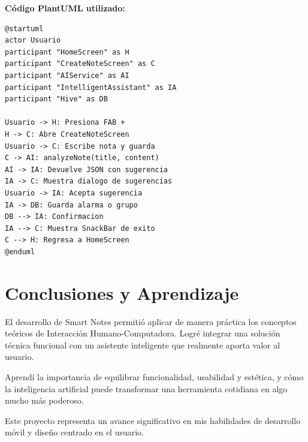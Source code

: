 \documentclass[12pt,a4paper]{article}
\begin{document}
\textbf{Código PlantUML utilizado:}
\begin{lstlisting}[basicstyle=\ttfamily\footnotesize]
@startuml
actor Usuario
participant "HomeScreen" as H
participant "CreateNoteScreen" as C
participant "AIService" as AI
participant "IntelligentAssistant" as IA
participant "Hive" as DB

Usuario -> H: Presiona FAB +
H -> C: Abre CreateNoteScreen
Usuario -> C: Escribe nota y guarda
C -> AI: analyzeNote(title, content)
AI -> IA: Devuelve JSON con sugerencia
IA -> C: Muestra dialogo de sugerencias
Usuario -> IA: Acepta sugerencia
IA -> DB: Guarda alarma o grupo
DB --> IA: Confirmacion
IA --> C: Muestra SnackBar de exito
C --> H: Regresa a HomeScreen
@enduml
\end{lstlisting}


\section{Conclusiones y Aprendizaje}
El desarrollo de Smart Notes permitió aplicar de manera práctica los conceptos teóricos de Interacción Humano-Computadora. Logré integrar una solución técnica funcional con un asistente inteligente que realmente aporta valor al usuario.

Aprendí la importancia de equilibrar funcionalidad, usabilidad y estética, y cómo la inteligencia artificial puede transformar una herramienta cotidiana en algo mucho más poderoso.

Este proyecto representa un avance significativo en mis habilidades de desarrollo móvil y diseño centrado en el usuario.
\end{document}
